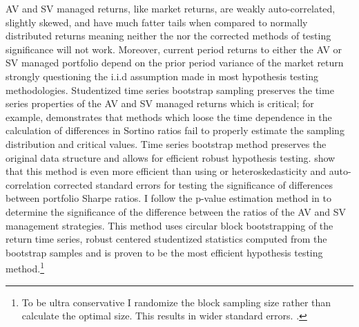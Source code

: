 AV and SV managed returns, like market returns, are weakly auto-correlated, slightly skewed, and have much fatter tails when compared to normally distributed returns meaning neither the \citet{jobson_1981} nor the corrected \citet{memmel_performance_2003} methods of testing significance will not work. Moreover, current period returns to either the AV or SV managed portfolio depend on the prior period variance of the market return strongly questioning the i.i.d assumption made in most hypothesis testing methodologies. Studentized time series bootstrap sampling preserves the time series properties of the AV and SV managed returns which is critical; for example, \citet{scherer_alternative_2004} demonstrates that methods which loose the time dependence in the calculation of differences in Sortino ratios fail to properly estimate the sampling distribution and critical values. Time series bootstrap method preserves the original data structure and allows for efficient robust hypothesis testing. \citep{politis_stationary_1994,davison1997bootstrap} \citet{ledoit_robust_2008} show that this method is even more efficient than using \citet{newey_simple_1987} or \citet{andrews_improved_1992} heteroskedasticity and auto-correlation corrected standard errors for testing the significance of differences between portfolio Sharpe ratios. I follow the p-value estimation method in \citet{ledoit_robust_2008} to determine the significance of the difference between the ratios of the AV and SV management strategies. This method uses circular block bootstrapping of the return time series, robust centered studentized statistics computed from the bootstrap samples and is proven to be the most efficient hypothesis testing method.\footnote{To be ultra conservative I randomize the block sampling size rather than calculate the optimal size. This results in wider standard errors. \citep{lahiri_theoretical_1999}.} \citep{politis_general_1992,ledoit_robust_2008}

